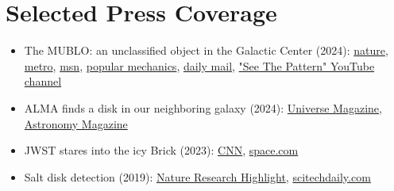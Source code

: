 
\setlength{\extrarowheight}{7pt}

\section*{Selected Press Coverage}

\begin{itemize}
    \item The MUBLO: an unclassified object in the Galactic Center (2024):
        \href{https://www.nature.com/articles/d41586-024-01702-4}{nature},
        \href{https://metro.co.uk/2024/06/19/something-lurking-milky-way-no-idea-21063534/}{metro},
        \href{https://www.msn.com/en-gb/news/world/scientists-uncover-mysterious-object-in-heart-of-milky-way-unlike-anything-seen-before/ar-BB1ouFBF}{msn},
        \href{https://www.popularmechanics.com/space/deep-space/a61145577/mysterious-microwave-emitting-object-milky-way-discovery/}{popular mechanics},
        \href{https://www.dailymail.co.uk/sciencetech/article-13543317/Scientists-spot-mysterious-object-galaxy-center-Milky-Way.html}{daily mail},
        \href{https://www.youtube.com/watch?v=lmBREIzeOI0}{"See The Pattern" YouTube channel}
    \item ALMA finds a disk in our neighboring galaxy (2024): 
            \href{https://universemagazine.com/en/alma-discovers-a-protoplanetary-disk-outside-the-milky-way-for-the-first-time/}{Universe Magazine},
            \href{https://www.astronomy.com/science/astronomers-discover-disk-around-star-in-another-galaxy-for-the-1st-time-ever/}{Astronomy Magazine}
    \item JWST stares into the icy Brick (2023):
            \href{https://www.cnn.com/2023/12/07/world/the-brick-milky-way-webb-telescope-scn/index.html}{CNN},
            \href{https://www.space.com/james-webb-space-telescope-investigates-the-brick-dark-nebula}{space.com}
    \item Salt disk detection (2019):
            \href{https://www.nature.com/articles/d41586-019-00569-0}{Nature Research Highlight},
            \href{https://scitechdaily.com/alma-discovers-ordinary-table-salt-in-disk-surrounding-massive-star/}{scitechdaily.com}
\end{itemize}
